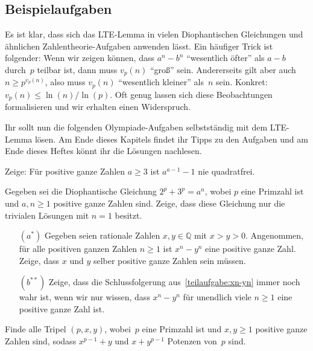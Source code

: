 \subsection*{Beispielaufgaben}
Es ist klar, dass sich das LTE-Lemma in vielen Diophantischen Gleichungen und ähnlichen Zahlentheorie-Aufgaben anwenden lässt. Ein häufiger Trick ist folgender: Wenn wir zeigen können, dass $a^n-b^n$ \enquote{wesentlich öfter} als $a-b$ durch~$p$ teilbar ist, dann muss $v_p(n)$ \enquote{groß} sein. Andererseits gilt aber auch $n\geqslant p^{v_p(n)}$, also muss $v_p(n)$ \enquote{wesentlich kleiner} als~$n$ sein. Konkret: $v_p(n)\leqslant \ln(n)/\ln(p)$. Oft genug lassen sich diese Beobachtungen formalisieren und wir erhalten einen Widerspruch.

Ihr sollt nun die folgenden Olympiade-Aufgaben selbstständig mit dem LTE-Lemma lösen. Am Ende dieses Kapitels findet ihr Tipps zu den Aufgaben und am Ende dieses Heftes könnt ihr die Lösungen nachlesen.

\begin{aufgabe*}\label{aufgabe:NieQuadratfrei}
	Zeige: Für positive ganze Zahlen $a\geqslant 3$ ist $a^{a-1}-1$ nie quadratfrei.
\end{aufgabe*}
\begin{aufgabe*}\label{aufgabe:2p3pan}
	Gegeben sei die Diophantische Gleichung $2^p+3^p=a^n$, wobei $p$ eine Primzahl ist und $a,n\geqslant 1$ positive ganze Zahlen sind. Zeige, dass diese Gleichung nur die trivialen Lösungen mit $n=1$ besitzt.
\end{aufgabe*}
\begin{aufgabe*}[**]\leavevmode\label{aufgabe:xn-yn}
	\begin{enumerate}[label={$(\alph*)$},ref={$(\alph*)$}]
		\item[$(a^*)$] Gegeben seien rationale Zahlen $x,y\in\mathbb Q$ mit $x>y>0$. Angenommen, für alle positiven ganzen Zahlen $n\geqslant 1$ ist $x^n-y^n$ eine positive ganze Zahl. Zeige, dass $x$ und $y$ selber positive ganze Zahlen sein müssen.\label{teilaufgabe:xn-yn}
		\item[$(b^{**})$] Zeige, dass die Schlussfolgerung aus~\ref{teilaufgabe:xn-yn} immer noch wahr ist, wenn wir nur wissen, dass $x^n-y^n$ für unendlich viele $n\geqslant 1$ eine positive ganze Zahl ist.\label{teilaufgabe:xn-ynEndlichViele}
	\end{enumerate}
\end{aufgabe*}
\begin{aufgabe*}[**]\label{aufgabe:IMOSL2014N5}
	Finde alle Tripel $(p,x,y)$, wobei~$p$ eine Primzahl ist und $x,y\geqslant 1$ positive ganze Zahlen sind, sodass $x^{p-1}+y$ und $x+y^{p-1}$ Potenzen von~$p$ sind.
\end{aufgabe*}

